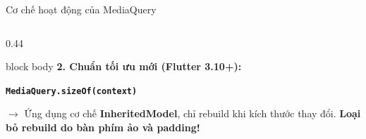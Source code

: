 \documentclass[aspectratio=169, 10pt]{beamer}
\begin{document}
\begin{frame}{Cơ chế hoạt động của MediaQuery}
\begin{columns}[T]
\begin{column}{0.44\textwidth}
\begin{beamercolorbox}[rounded=true, shadow=false, wd=\textwidth, sep=4pt]{block body}
        \vskip 0.08cm
        \textbf{2. Chuẩn tối ưu mới (Flutter 3.10+):}
        \begin{center}
          \texttt{\textbf{MediaQuery.sizeOf(context)}}
        \end{center}
        $\rightarrow$ Ứng dụng cơ chế \textbf{InheritedModel}, chỉ rebuild khi kích thước thay đổi. \textbf{Loại bỏ rebuild do bàn phím ảo và padding!}
      \end{beamercolorbox}
    \end{column}
  \end{columns}
\end{frame}

\end{document}
